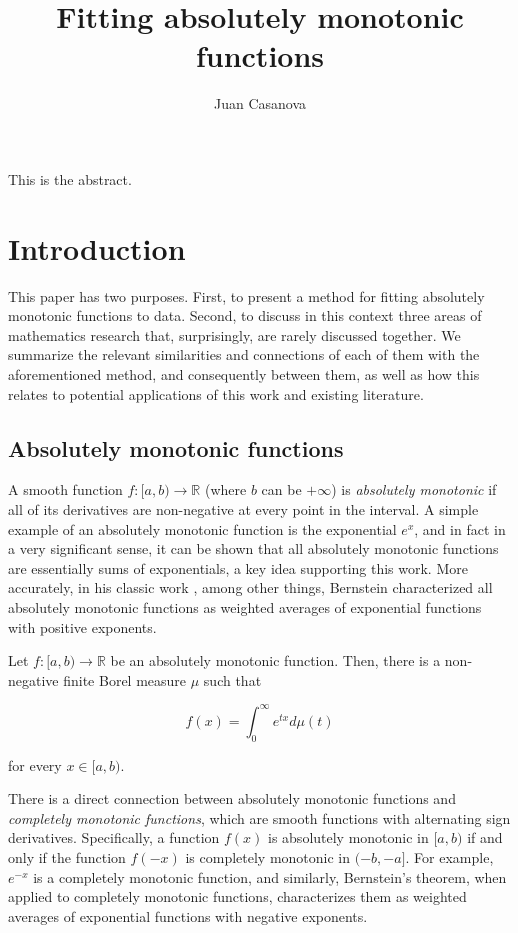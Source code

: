 \documentclass[12pt,a4paper]{article}
\title{Fitting absolutely monotonic functions}
\author{Juan Casanova}
\newcommand{\realfunction}[2] {{#1: #2 \rightarrow \mathbb{R}}}
\begin{document}
\maketitle

This is the abstract.

\tableofcontents

\section{Introduction}

This paper has two purposes. First, to present a method for fitting absolutely monotonic functions to data. Second, to discuss in this context three areas of mathematics research that, surprisingly, are rarely discussed together. We summarize the relevant similarities and connections of each of them with the aforementioned method, and consequently between them, as well as how this relates to potential applications of this work and existing literature.

\subsection{Absolutely monotonic functions}

A smooth function $\realfunction{f}{[a,b)}$ (where $b$ can be $+\infty$) is {\emph{absolutely monotonic}} if all of its derivatives are non-negative at every point in the interval. A simple example of an absolutely monotonic function is the exponential $e^x$, and in fact in a very significant sense, it can be shown that all absolutely monotonic functions are essentially sums of exponentials, a key idea supporting this work. More accurately, in his classic work \cite{1929_bernstein_absolutely_monotonic}, among other things, Bernstein characterized all absolutely monotonic functions as weighted averages of exponential functions with positive exponents.

\begin{theorem}
Let $\realfunction{f}{[a,b)}$ be an absolutely monotonic function. Then, there is a non-negative finite Borel measure $\mu$ such that

\begin{equation}
f(x) = \int_{0}^{\infty} e^{tx} d \mu(t)
\end{equation}

\noindent for every $x \in [a,b)$.
\end{theorem}

There is a direct connection between absolutely monotonic functions and {\emph{completely monotonic functions}}, which are smooth functions with alternating sign derivatives. Specifically, a function $f(x)$ is absolutely monotonic in $[a,b)$ if and only if the function $f(-x)$ is completely monotonic in $(-b,-a]$. For example, $e^{-x}$ is a completely monotonic function, and similarly, Bernstein's theorem, when applied to completely monotonic functions, characterizes them as weighted averages of exponential functions with negative exponents.
\end{document}
